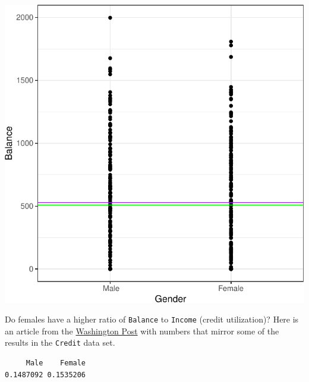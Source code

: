 \documentclass[
]{article}
\newenvironment{Shaded}{\begin{snugshade}}{\end{snugshade}}
\newcommand{\DecValTok}[1]{\textcolor[rgb]{0.00,0.00,0.81}{#1}}
\newcommand{\FunctionTok}[1]{\textcolor[rgb]{0.00,0.00,0.00}{#1}}
\newcommand{\NormalTok}[1]{#1}
\newcommand{\OtherTok}[1]{\textcolor[rgb]{0.56,0.35,0.01}{#1}}
\newcommand{\SpecialCharTok}[1]{\textcolor[rgb]{0.00,0.00,0.00}{#1}}
\begin{document}
\begin{center}\includegraphics{SDM-CHAP24_files/figure-latex/GGSD-1} \end{center}

Do females have a higher ratio of \texttt{Balance} to \texttt{Income} (credit utilization)? Here is an article from the \href{https://www.washingtonpost.com/news/get-there/wp/2016/02/17/how-being-a-woman-can-ding-your-credit-score/}{Washington Post} with numbers that mirror some of the results in the \texttt{Credit} data set.

\begin{Shaded}
\end{Shaded}

\begin{verbatim}
     Male    Female 
0.1487092 0.1535206 
\end{verbatim}
\end{document}
